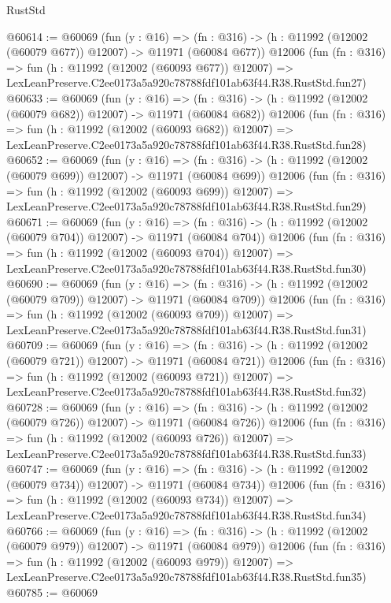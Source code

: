 \begin{lexlean}{RustStd}
\begin{coremodule}
@60614 := @60069
    (fun (y : @16) =>
    (fn : @316) -> (h : @11992 (@12002 (@60079 @677)) @12007) -> @11971 (@60084 @677))
    @12006
    (fun (fn : @316) =>
    fun (h : @11992 (@12002 (@60093 @677)) @12007) =>
    LexLeanPreserve.C2ee0173a5a920c78788fdf101ab63f44.R38.RustStd.fun27)
@60633 := @60069
    (fun (y : @16) =>
    (fn : @316) -> (h : @11992 (@12002 (@60079 @682)) @12007) -> @11971 (@60084 @682))
    @12006
    (fun (fn : @316) =>
    fun (h : @11992 (@12002 (@60093 @682)) @12007) =>
    LexLeanPreserve.C2ee0173a5a920c78788fdf101ab63f44.R38.RustStd.fun28)
@60652 := @60069
    (fun (y : @16) =>
    (fn : @316) -> (h : @11992 (@12002 (@60079 @699)) @12007) -> @11971 (@60084 @699))
    @12006
    (fun (fn : @316) =>
    fun (h : @11992 (@12002 (@60093 @699)) @12007) =>
    LexLeanPreserve.C2ee0173a5a920c78788fdf101ab63f44.R38.RustStd.fun29)
@60671 := @60069
    (fun (y : @16) =>
    (fn : @316) -> (h : @11992 (@12002 (@60079 @704)) @12007) -> @11971 (@60084 @704))
    @12006
    (fun (fn : @316) =>
    fun (h : @11992 (@12002 (@60093 @704)) @12007) =>
    LexLeanPreserve.C2ee0173a5a920c78788fdf101ab63f44.R38.RustStd.fun30)
@60690 := @60069
    (fun (y : @16) =>
    (fn : @316) -> (h : @11992 (@12002 (@60079 @709)) @12007) -> @11971 (@60084 @709))
    @12006
    (fun (fn : @316) =>
    fun (h : @11992 (@12002 (@60093 @709)) @12007) =>
    LexLeanPreserve.C2ee0173a5a920c78788fdf101ab63f44.R38.RustStd.fun31)
@60709 := @60069
    (fun (y : @16) =>
    (fn : @316) -> (h : @11992 (@12002 (@60079 @721)) @12007) -> @11971 (@60084 @721))
    @12006
    (fun (fn : @316) =>
    fun (h : @11992 (@12002 (@60093 @721)) @12007) =>
    LexLeanPreserve.C2ee0173a5a920c78788fdf101ab63f44.R38.RustStd.fun32)
@60728 := @60069
    (fun (y : @16) =>
    (fn : @316) -> (h : @11992 (@12002 (@60079 @726)) @12007) -> @11971 (@60084 @726))
    @12006
    (fun (fn : @316) =>
    fun (h : @11992 (@12002 (@60093 @726)) @12007) =>
    LexLeanPreserve.C2ee0173a5a920c78788fdf101ab63f44.R38.RustStd.fun33)
@60747 := @60069
    (fun (y : @16) =>
    (fn : @316) -> (h : @11992 (@12002 (@60079 @734)) @12007) -> @11971 (@60084 @734))
    @12006
    (fun (fn : @316) =>
    fun (h : @11992 (@12002 (@60093 @734)) @12007) =>
    LexLeanPreserve.C2ee0173a5a920c78788fdf101ab63f44.R38.RustStd.fun34)
@60766 := @60069
    (fun (y : @16) =>
    (fn : @316) -> (h : @11992 (@12002 (@60079 @979)) @12007) -> @11971 (@60084 @979))
    @12006
    (fun (fn : @316) =>
    fun (h : @11992 (@12002 (@60093 @979)) @12007) =>
    LexLeanPreserve.C2ee0173a5a920c78788fdf101ab63f44.R38.RustStd.fun35)
@60785 := @60069

\end{coremodule}
\end{lexlean}
